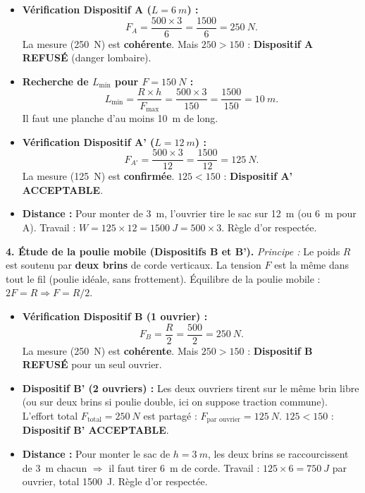 \documentclass[11pt]{article}
\begin{document}
\begin{exoresolu}
\begin{itemize}
\item \textbf{Vérification Dispositif A ($L = \SI{6}{m}$) :}
\[ F_A = \frac{500 \times 3}{6} = \frac{1500}{6} = \SI{250}{N}. \]
La mesure (\SI{250}{N}) est \textbf{cohérente}. Mais $250 > 150$ : \textbf{Dispositif A REFUSÉ} (danger lombaire).
\item \textbf{Recherche de $L_{\min}$ pour $F = \SI{150}{N}$ :}
\[ L_{\min} = \frac{R \times h}{F_{\max}} = \frac{500 \times 3}{150} = \frac{1500}{150} = \SI{10}{m}. \]
Il faut une planche d'au moins \SI{10}{m} de long.
\item \textbf{Vérification Dispositif A' ($L = \SI{12}{m}$) :}
\[ F_{A'} = \frac{500 \times 3}{12} = \frac{1500}{12} = \SI{125}{N}. \]
La mesure (\SI{125}{N}) est \textbf{confirmée}. $125 < 150$ : \textbf{Dispositif A' ACCEPTABLE}.
\item \textbf{Distance :} Pour monter de \SI{3}{m}, l'ouvrier tire le sac sur \SI{12}{m} (ou \SI{6}{m} pour A). Travail : $W = 125 \times 12 = \SI{1500}{J} = 500 \times 3$. Règle d'or respectée.
\end{itemize}

\textbf{4. Étude de la poulie mobile (Dispositifs B et B').}
\emph{Principe :} Le poids $R$ est soutenu par \textbf{deux brins} de corde verticaux. La tension $F$ est la même dans tout le fil (poulie idéale, sans frottement). Équilibre de la poulie mobile : $2F = R \Rightarrow F = R/2$.

\begin{itemize}
\item \textbf{Vérification Dispositif B (1 ouvrier) :}
\[ F_B = \frac{R}{2} = \frac{500}{2} = \SI{250}{N}. \]
La mesure (\SI{250}{N}) est \textbf{cohérente}. Mais $250 > 150$ : \textbf{Dispositif B REFUSÉ} pour un seul ouvrier.
\item \textbf{Dispositif B' (2 ouvriers) :} Les deux ouvriers tirent sur le même brin libre (ou sur deux brins si poulie double, ici on suppose traction commune). L'effort total $F_{\text{total}} = \SI{250}{N}$ est partagé : $F_{\text{par ouvrier}} = \SI{125}{N}$.
$125 < 150$ : \textbf{Dispositif B' ACCEPTABLE}.
\item \textbf{Distance :} Pour monter le sac de $h = \SI{3}{m}$, les deux brins se raccourcissent de \SI{3}{m} chacun $\Rightarrow$ il faut tirer \SI{6}{m} de corde. Travail : $125 \times 6 = \SI{750}{J}$ par ouvrier, total \SI{1500}{J}. Règle d'or respectée.
\end{itemize}


\end{exoresolu}
\end{document}
